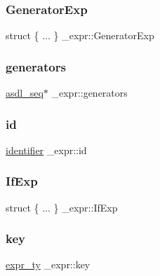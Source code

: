 \mbox{\label{struct__expr_af640b475e781ed62c348cfa94968b26d}} 
\subsubsection{\texorpdfstring{GeneratorExp}{GeneratorExp}}
{\footnotesize\ttfamily struct \{ ... \}   \+\_\+expr\+::\+Generator\+Exp}

\mbox{\label{struct__expr_a4f5c683305e32502095b6c36148ebee8}} 
\subsubsection{\texorpdfstring{generators}{generators}}
{\footnotesize\ttfamily \mbox{\hyperlink{structasdl__seq}{asdl\+\_\+seq}}$\ast$ \+\_\+expr\+::generators}

\mbox{\label{struct__expr_a041b70e629efb93b154c329c681c3ca0}} 
\subsubsection{\texorpdfstring{id}{id}}
{\footnotesize\ttfamily \mbox{\hyperlink{asdl_8h_a78ca2081e230a95abc88c411c9816775}{identifier}} \+\_\+expr\+::id}

\mbox{\label{struct__expr_ad751ebffc2df0e8b36723aca4352bef1}} 
\subsubsection{\texorpdfstring{IfExp}{IfExp}}
{\footnotesize\ttfamily struct \{ ... \}   \+\_\+expr\+::\+If\+Exp}

\mbox{\label{struct__expr_af1e96cb8f6533bcd6f2380239aa5d0bf}} 
\subsubsection{\texorpdfstring{key}{key}}
{\footnotesize\ttfamily \mbox{\hyperlink{_python-ast_8h_a56d3705e020a071405094a220c4592bd}{expr\+\_\+ty}} \+\_\+expr\+::key}

